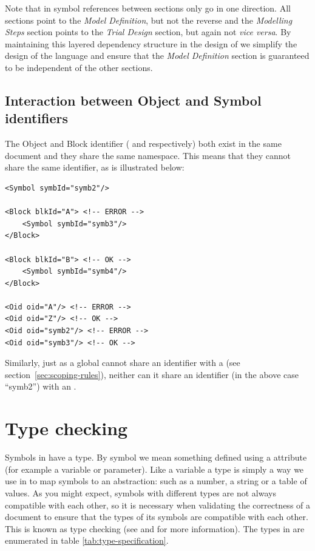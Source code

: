 Note that in \pharmml symbol references between sections only go in one
direction. All sections point to the \emph{Model Definition}, but not
the reverse and the \emph{Modelling Steps} section points to the
\emph{Trial Design} section, but again not \emph{vice
  versa}\xspace. By maintaining this layered dependency structure in
the design of \pharmml we simplify the design of the language and ensure
that the \emph{Model Definition} section is guaranteed to be
independent of the other \pharmml sections.

\subsection{Interaction between Object and Symbol identifiers}

The Object and Block identifier ( and 
respectively) both exist in the same \pharmml document and they share
the same namespace. This means that they cannot share the same
identifier, as is illustrated below:
%
\lstset{language=XML}
\begin{lstlisting}
<Symbol symbId="symb2"/>

<Block blkId="A"> <!-- ERROR -->
	<Symbol symbId="symb3"/>
</Block>

<Block blkId="B"> <!-- OK -->
	<Symbol symbId="symb4"/>
</Block>

<Oid oid="A"/> <!-- ERROR -->
<Oid oid="Z"/> <!-- OK -->
<Oid oid="symb2"/> <!-- ERROR -->
<Oid oid="symb3"/> <!-- OK -->
\end{lstlisting}
%
Similarly, just as a global  cannot share an identifier with a
 (see section~\ref{sec:scoping-rules}), neither can it
share an identifier (in the above case ``symb2'') with an .


\section{Type checking}
\label{sec:type-checking}

Symbols in \pharmml have a type. By symbol we mean something defined
using a  attribute (for example a variable or
parameter). Like a variable a type is simply a way we use in \pharmml to
map symbols to an abstraction: such as a number, a string or a table
of values. As you might expect, symbols with different types are not
always compatible with each other, so it is necessary when validating
the correctness of a \pharmml document to ensure that the types of its
symbols are compatible with each other. This is known as type checking
(see \cite[Chapter6]{Aho:1986fk} and \cite[Chapter 8]{Parr:2010uq} for
more information). The types in \pharmml are enumerated in table
\ref{tab:type-specification}.


